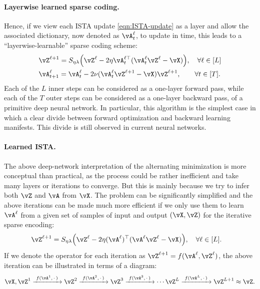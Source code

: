 \documentclass[../../book-main.tex]{subfiles}
\begin{document}
\paragraph{Layerwise learned sparse coding.}
Hence, if we view each ISTA update \eqref{eqn:ISTA-update} as a layer and allow the associated dictionary, now denoted as $\vA_t^\ell$, to update in time, this leads to a  ``layerwise-learnable'' sparse coding scheme:
\begin{align}
    & \vZ^{\ell + 1} = S_{\eta\lambda}\rp{\vZ^{\ell} - 2\eta\vA_{t}^{\ell\top}(\vA_{t}^\ell\vZ^{\ell} - \vX)}, \quad \forall \ell \in [L] \\ 
    & \vA_{t + 1}^\ell = \vA_{t}^\ell - 2\nu (\vA_{t}^\ell\vZ^{\ell + 1} - \vX)\vZ^{\ell + 1}, \qquad \forall t \in [T].
\end{align}
Each of the \(L\) inner steps can be considered as a one-layer  forward pass, while each of  the \(T\) outer steps can be considered as a one-layer  backward pass, of a primitive deep neural network. In particular, this algorithm is the simplest case in which a clear divide between forward optimization and backward learning manifests. This divide is still observed in current neural networks.

\paragraph{Learned ISTA.} The above deep-network  interpretation of the alternating minimization is more conceptual than practical, as the process could be rather inefficient and take many layers or iterations to converge. But this is mainly because we try to infer both \(\vZ\) and \(\vA\) from \(\vX\). The problem can be significantly simplified and the above iterations can be made much more efficient if we only use them to learn \(\vA^\ell\) from a given set of samples of input and output  \((\vX, \vZ)\) for the iterative sparse encoding:
\begin{align}
    & \vZ^{\ell + 1} = S_{\eta\lambda}\rp{\vZ^{\ell} - 2\eta(\vA^{\ell})^{\top}(\vA^\ell\vZ^{\ell} - \vX)}, \quad \forall \ell \in [L].
\end{align}
If we denote the operator for each iteration as $\vZ^{\ell + 1} = f(\vA^\ell, \vZ^\ell)$, the above iteration can be illustrated in terms of a diagram:
\begin{equation*}
\vX, \vZ^1 \xrightarrow{\hspace{1mm} f(\vA^1,\,\cdot\,) \hspace{1mm}}  \vZ^2 \xrightarrow{\hspace{1mm} f(\vA^2,\,\cdot\,) \hspace{1mm}}  \vZ^3  \xrightarrow{\hspace{1mm} f(\vA^3,\,\cdot\,) \hspace{1mm}} \cdots \vZ^{L}  \xrightarrow{\hspace{1mm} f(\vA^{L},\,\cdot\,) \hspace{1mm}} \vZ^{L + 1} \approx \vZ.  
\label{eqn:deep-sparse-encoding}
\end{equation*}
\end{document}
